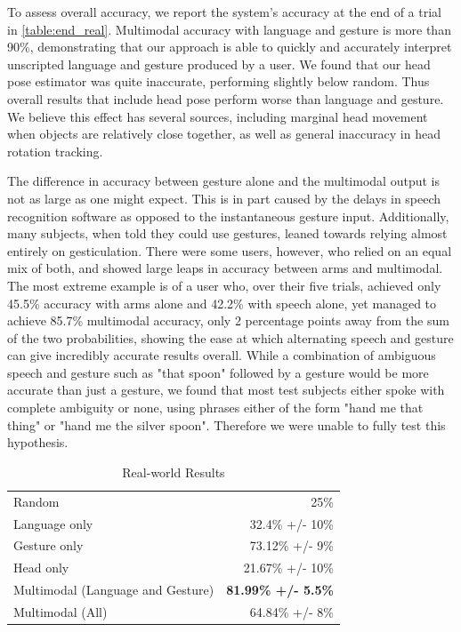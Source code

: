 \documentclass[a4paper, 11pt]{article} %
\begin{document}
To assess overall accuracy, we report the system's accuracy at the end
of a trial in \ref{table:end_real}.  Multimodal accuracy with language
and gesture is more than 90\%, demonstrating that our approach is able
to quickly and accurately interpret unscripted language and gesture
produced by a user.  We found that our head pose estimator was quite
inaccurate, performing slightly below random.  Thus overall
results that include head pose perform worse than language and
gesture.  We believe this effect has several sources, including marginal head movement when objects are relatively close together, as well as general inaccuracy in head rotation tracking. 

The difference in accuracy between gesture alone and the multimodal output is not as large as one might expect. This is in part caused by the delays in speech recognition software as opposed to the instantaneous gesture input. Additionally, many subjects, when told they could use gestures, leaned towards relying almost entirely on gesticulation. There were some users, however, who relied on an equal mix of both, and showed large leaps in accuracy between arms and multimodal. The most extreme example is of a user who, over their five trials, achieved only 45.5\% accuracy with arms alone and 42.2\% with speech alone, yet managed to achieve 85.7\% multimodal accuracy, only 2 percentage points away from the sum of the two probabilities, showing the ease at which alternating speech and gesture can give incredibly accurate results overall. While a combination of ambiguous speech and gesture such as "that spoon" followed by a gesture would be more accurate than just a gesture, we found that most test subjects either spoke with complete ambiguity or none, using phrases either of the form "hand me that thing" or "hand me the silver spoon". Therefore we were unable to fully test this hypothesis.
\begin{table}
\caption{Real-world Results\label{table:real_results}}
\centering
\begin{tabular}{lr}
\toprule
Random & 25\%\\
Language only &  32.4\% +/- 10\%\\
Gesture only  &  73.12\% +/- 9\%\\
Head only     &  21.67\% +/- 10\%\\
Multimodal (Language and Gesture) & {\bf 81.99\% +/- 5.5\%}\\
Multimodal (All) &  64.84\% +/- 8\%\\
\bottomrule
\end{tabular}
\end{table}
\end{document}
